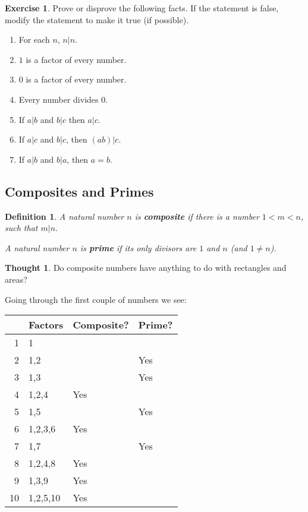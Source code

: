 \documentclass[11pt]{article}
\newtheorem{dfn}[thm]{Definition}
\theoremstyle{definition}
\newtheorem{exercise}{Exercise}
\newtheorem{thought}{Thought}
\numberwithin{thm}{section}
\begin{document}
\begin{exercise} Prove or disprove the following facts. If the statement is false, modify the statement to make it true (if possible).
	\begin{enumerate}
    	\item For each $n$, $n | n$.
        \item $1$ is a factor of every number.
        \item $0$ is a factor of every number.
        \item Every number divides $0$.
        \item If $a | b$ and $b | c$ then $a | c$.
        \item If $a | c$ and $b | c$, then $(ab) | c$.
        \item If $a | b$ and $b | a$, then $a = b$.
    \end{enumerate}
\end{exercise}

\subsection{Composites and Primes}

\begin{dfn} A natural number $n$ is \textbf{composite} if there is a number $1 < m < n$, such that $m | n$.

A natural number $n$ is \textbf{prime} if its only divisors are $1$ and $n$ (and $1 \neq n$).
\end{dfn}

\begin{thought} Do composite numbers have anything to do with rectangles and areas?
\end{thought}

Going through the first couple of numbers we see:

\begin{table}[!ht]
\begin{tabular}{r|l|l|l}
   & Factors  & Composite? & Prime? \\\hline
1  & 1        &            &        \\\hline
2  & 1,2      &            & Yes    \\\hline
3  & 1,3      &            & Yes    \\\hline
4  & 1,2,4    & Yes        &        \\\hline
5  & 1,5      &            & Yes    \\\hline
6  & 1,2,3,6  & Yes        &        \\\hline
7  & 1,7      &            & Yes    \\\hline
8  & 1,2,4,8  & Yes        &        \\\hline
9  & 1,3,9    & Yes        &        \\\hline
10 & 1,2,5,10 & Yes        &       
\end{tabular}
\end{table}
\end{document}
